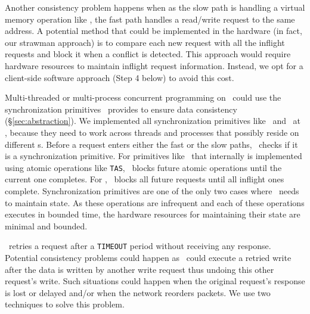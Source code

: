 Another consistency problem happens when as the slow path is handling a virtual memory operation like \sysfree, 
the fast path handles a read/write request to the same address.
A potential method that could be implemented in the hardware (in fact, our strawman approach) 
is to compare each new request with all the inflight requests and block it when a conflict is detected.
This approach would require hardware resources to maintain inflight request information.
Instead, we opt for a client-side software approach (Step 4 below) to avoid this cost.
\fi

Multi-threaded or multi-process concurrent programming on \sys\ could use the synchronization primitives \sys\ provides to ensure data consistency (\S\ref{sec:abstraction}).
We implemented all synchronization primitives like \syslock\ and \fence\ at \MN,
because they need to work across threads and processes that possibly reside on different \CN{}s.
Before a request enters either the fast or the slow paths, 
\MN\ checks if it is a synchronization primitive.
For primitives like \syslock\ that internally is implemented using atomic operations like \texttt{TAS}, \MN\ blocks future atomic operations until the current one completes.
For \fence, \MN\ blocks all future requests until all inflight ones complete.
Synchronization primitives are one of the only two cases where \MN\ needs to maintain state.
As these operations are infrequent and each of these operations executes in bounded time, the hardware resources for maintaining their state are minimal and bounded.

\syslib\ retries a request after a \texttt{TIMEOUT} period without receiving any response. Potential consistency problems could happen as \sysboard\ could execute a retried write after the data is written by another write request thus undoing this other request's write. Such situations could happen when the original request's response is lost or delayed and/or when the network reorders packets. 
%
We use two techniques to solve this problem.

